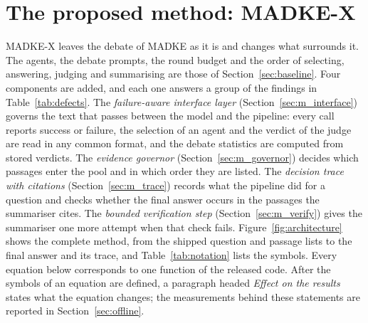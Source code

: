 \section{The proposed method: MADKE-X}
\label{sec:method}

MADKE-X leaves the debate of MADKE as it is and changes what surrounds it. The agents, the debate prompts, the round budget and the order of selecting, answering, judging and summarising are those of Section~\ref{sec:baseline}. Four components are added, and each one answers a group of the findings in Table~\ref{tab:defects}. The \emph{failure-aware interface layer} (Section~\ref{sec:m_interface}) governs the text that passes between the model and the pipeline: every call reports success or failure, the selection of an agent and the verdict of the judge are read in any common format, and the debate statistics are computed from stored verdicts. The \emph{evidence governor} (Section~\ref{sec:m_governor}) decides which passages enter the pool and in which order they are listed. The \emph{decision trace with citations} (Section~\ref{sec:m_trace}) records what the pipeline did for a question and checks whether the final answer occurs in the passages the summariser cites. The \emph{bounded verification step} (Section~\ref{sec:m_verify}) gives the summariser one more attempt when that check fails. Figure~\ref{fig:architecture} shows the complete method, from the shipped question and passage lists to the final answer and its trace, and Table~\ref{tab:notation} lists the symbols. Every equation below corresponds to one function of the released code. After the symbols of an equation are defined, a paragraph headed \emph{Effect on the results} states what the equation changes; the measurements behind these statements are reported in Section~\ref{sec:offline}.

